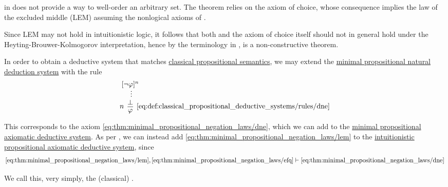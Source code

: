 \begin{example}\label{ex:rem:brouwer_heyting_kolmogorov_interpretation/well_ordering_principle_zfc}
   in \hyperref[def:set]{} does not provide a way to well-order an arbitrary set. The theorem relies on the axiom of choice, whose consequence  implies the law of the excluded middle (LEM) assuming the nonlogical axioms of .

  Since LEM may not hold in intuitionistic logic, it follows that both  and the axiom of choice itself should not in general hold under the Heyting-Brouwer-Kolmogorov interpretation, hence by the terminology in ,  is a non-constructive theorem.
\end{example}

\begin{definition}\label{def:classical_propositional_deductive_systems}
  In order to obtain a deductive system that matches \hyperref[def:propositional_semantics]{classical propositional semantics}, we may extend the \hyperref[def:minimal_propositional_natural_deduction_system]{minimal propositional natural deduction system} with the rule
  \begin{equation*}\taglabel[\textrm{DNE}]{eq:def:classical_propositional_deductive_systems/rules/dne}
    \begin{prooftree}
      \hypo{ [\neg \varphi]^n }
      \ellipsis {} { \bot }
      \infer[left label=\( n \)]1[\ref{eq:def:classical_propositional_deductive_systems/rules/dne}]{ \varphi }
    \end{prooftree}
  \end{equation*}

  This corresponds to the axiom \eqref{eq:thm:minimal_propositional_negation_laws/dne}, which we can add to the \hyperref[def:minimal_propositional_axiomatic_deductive_system]{minimal propositional axiomatic deductive system}. As per , we can instead add \eqref{eq:thm:minimal_propositional_negation_laws/lem} to the \hyperref[def:intuitionistic_propositional_deductive_systems]{intuitionistic propositional axiomatic deductive system}, since
  \begin{equation*}
    \eqref{eq:thm:minimal_propositional_negation_laws/lem}, \eqref{eq:thm:minimal_propositional_negation_laws/efq} \vdash \eqref{eq:thm:minimal_propositional_negation_laws/dne}
  \end{equation*}

  We call this, very simply, the (classical) .
\end{definition}

